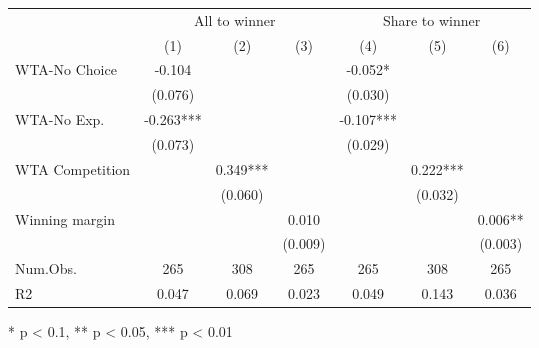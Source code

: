 \begin{table}[t]
\fontsize{12.0pt}{14.4pt}\selectfont
\begin{tabular*}{\linewidth}{@{\extracolsep{\fill}}lcccccc}
\toprule
 & \multicolumn{3}{c}{All to winner} & \multicolumn{3}{c}{Share to winner} \\ 
\cmidrule(lr){2-4} \cmidrule(lr){5-7}
  & (1) & (2) & (3) & (4) & (5) & (6) \\ 
\midrule\addlinespace[2.5pt]
WTA-No Choice & -0.104 &  &  & -0.052* &  &  \\ 
 & (0.076) &  &  & (0.030) &  &  \\ 
WTA-No Exp. & -0.263*** &  &  & -0.107*** &  &  \\ 
 & (0.073) &  &  & (0.029) &  &  \\ 
WTA Competition &  & 0.349*** &  &  & 0.222*** &  \\ 
 &  & (0.060) &  &  & (0.032) &  \\ 
Winning margin &  &  & 0.010 &  &  & 0.006** \\ 
{} & {} & {} & {(0.009)} & {} & {} & {(0.003)} \\ 
Num.Obs. & 265 & 308 & 265 & 265 & 308 & 265 \\ 
R2 & 0.047 & 0.069 & 0.023 & 0.049 & 0.143 & 0.036 \\ 
\bottomrule
\end{tabular*}
\begin{minipage}{\linewidth}
* p < 0.1, ** p < 0.05, *** p < 0.01\\
\end{minipage}
\end{table}

